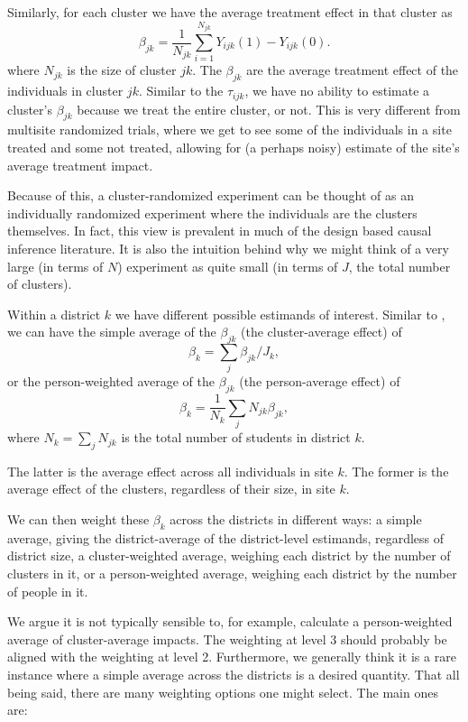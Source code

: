 \documentclass[12pt]{article}
\begin{document}
Similarly, for each cluster we have the average treatment effect in that cluster as
$$
\beta_{jk} = \frac{1}{N_{jk}} \sum_{i=1}^{N_{jk}} Y_{ijk}(1) - Y_{ijk}(0) .
$$
where $N_{jk}$ is the size of cluster $jk$.
The $\beta_{jk}$ are the average treatment effect of the individuals in cluster $jk$.
Similar to the $\tau_{ijk}$, we have no ability to estimate a cluster's $\beta_{jk}$ because we treat the entire cluster, or not.
This is very different from multisite randomized trials, where we get to see some of the individuals in a site treated and some not treated, allowing for (a perhaps noisy) estimate of the site's average treatment impact.

Because of this, a cluster-randomized experiment can be thought of as an individually randomized experiment where the individuals are the clusters themselves.
In fact, this view is prevalent in much of the design based causal inference literature.
It is also the intuition behind why we might think of a very large (in terms of $N$) experiment as quite small (in terms of $J$, the total number of clusters).

Within a district $k$ we have different possible estimands of interest.
Similar to \citet{miratrix2021applied}, we can have the simple average of the $\beta_{jk}$ (the cluster-average effect) of
$$ \beta_k = \sum_j \beta_{jk} / J_k , $$
or the person-weighted average of the $\beta_{jk}$ (the person-average effect) of
$$ \beta_k = \frac{1}{N_k} \sum_j N_{jk} \beta_{jk} ,$$
where $N_k = \sum_{j} N_{jk}$ is the total number of students in district $k$.

The latter is the average effect across all individuals in site $k$.
The former is the average effect of the clusters, regardless of their size, in site $k$.

We can then weight these $\beta_k$ across the districts in different ways: a simple average, giving the district-average of the district-level estimands, regardless of district size, a cluster-weighted average, weighing each district by the number of clusters in it, or a person-weighted average, weighing each district by the number of people in it.

We argue it is not typically sensible to, for example, calculate a person-weighted average of cluster-average impacts.
The weighting at level 3 should probably be aligned with the weighting at level 2.
Furthermore, we generally think it is a rare instance where a simple average across the districts is a desired quantity.
That all being said, there are many weighting options one might select.
The main ones are:
\end{document}
